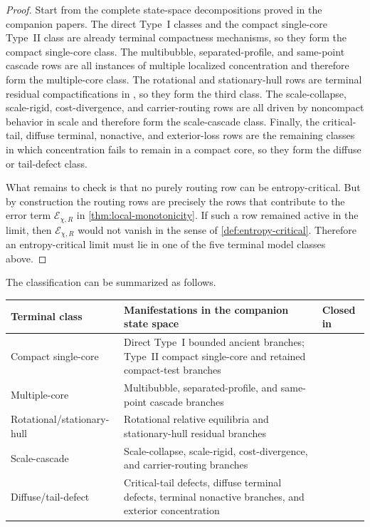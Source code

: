 \documentclass[11pt]{amsart}
\numberwithin{equation}{section}
\theoremstyle{plain}
\theoremstyle{definition}
\theoremstyle{remark}
\newcommand{\Err}{\mathcal E}
\begin{document}
\begin{proof}
Start from the complete state-space decompositions proved in the companion
papers.  The direct Type~I classes and the compact single-core Type~II class
are already terminal compactness mechanisms, so they form the compact
single-core class.  The multibubble, separated-profile, and same-point cascade
rows are all instances of multiple localized concentration and therefore form
the multiple-core class.  The rotational and stationary-hull rows are terminal
residual compactifications in \cite{BallesterResidual}, so they form the third
class.  The scale-collapse, scale-rigid, cost-divergence, and carrier-routing
rows are all driven by noncompact behavior in scale and therefore form the
scale-cascade class.  Finally, the critical-tail, diffuse terminal, nonactive,
and exterior-loss rows are the remaining classes in which concentration fails
to remain in a compact core, so they form the diffuse or tail-defect class.

What remains to check is that no purely routing row can be entropy-critical.
But by construction the routing rows are precisely the rows that contribute to
the error term \(\Err_{\chi,R}\) in \cref{thm:local-monotonicity}.  If such a
row remained active in the limit, then \(\Err_{\chi,R}\) would not vanish in
the sense of \cref{def:entropy-critical}.  Therefore an entropy-critical limit
must lie in one of the five terminal model classes above.
\end{proof}

The classification can be summarized as follows.

\begin{center}
\small
\setlength{\tabcolsep}{4pt}
\begin{tabular}{@{}>{\raggedright\arraybackslash}p{}
								>{\raggedright\arraybackslash}p{}
								>{\raggedright\arraybackslash}p{}@{}}
\toprule
Terminal class & Manifestations in the companion state space & Closed in \\
\midrule
Compact single-core & Direct Type~I bounded ancient branches; Type~II compact single-core and retained compact-test branches & \cite{BallesterSetup,BallesterTypeII} \\
Multiple-core & Multibubble, separated-profile, and same-point cascade branches & \cite{BallesterTypeII} \\
Rotational/stationary-hull & Rotational relative equilibria and stationary-hull residual branches & \cite{BallesterResidual} \\
Scale-cascade & Scale-collapse, scale-rigid, cost-divergence, and carrier-routing branches & \cite{BallesterTypeII} \\
Diffuse/tail-defect & Critical-tail defects, diffuse terminal defects, terminal nonactive branches, and exterior concentration & \cite{BallesterResidual,BallesterTypeII} \\
\bottomrule
\end{tabular}
\end{center}
\end{document}
